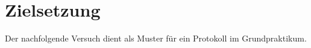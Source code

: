 \section{Zielsetzung}
\label{sec:zielsetzung}

Der nachfolgende Versuch dient als Muster für ein Protokoll im Grundpraktikum.
